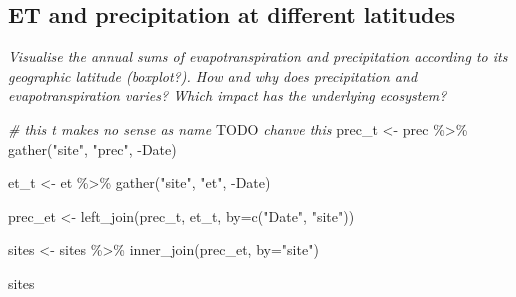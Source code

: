 \documentclass[
]{article}
\newenvironment{Shaded}{\begin{snugshade}}{\end{snugshade}}
\newcommand{\AlertTok}[1]{\textcolor[rgb]{0.94,0.16,0.16}{#1}}
\newcommand{\AttributeTok}[1]{\textcolor[rgb]{0.77,0.63,0.00}{#1}}
\newcommand{\CommentTok}[1]{\textcolor[rgb]{0.56,0.35,0.01}{\textit{#1}}}
\newcommand{\FunctionTok}[1]{\textcolor[rgb]{0.00,0.00,0.00}{#1}}
\newcommand{\NormalTok}[1]{#1}
\newcommand{\OtherTok}[1]{\textcolor[rgb]{0.56,0.35,0.01}{#1}}
\newcommand{\SpecialCharTok}[1]{\textcolor[rgb]{0.00,0.00,0.00}{#1}}
\newcommand{\StringTok}[1]{\textcolor[rgb]{0.31,0.60,0.02}{#1}}
\begin{document}
\hypertarget{et-and-precipitation-at-different-latitudes}{%
\subsection{ET and precipitation at different
latitudes}\label{et-and-precipitation-at-different-latitudes}}

\emph{Visualise the annual sums of evapotranspiration and precipitation
according to its geographic latitude (boxplot?). How and why does
precipitation and evapotranspiration varies? Which impact has the
underlying ecosystem?}

\begin{Shaded}
\begin{Highlighting}[]
\CommentTok{\# this t makes no sense as name }\AlertTok{TODO}\CommentTok{ chanve this}
\NormalTok{prec\_t }\OtherTok{\textless{}{-}}\NormalTok{ prec }\SpecialCharTok{\%\textgreater{}\%}
  \FunctionTok{gather}\NormalTok{(}\StringTok{"site"}\NormalTok{, }\StringTok{"prec"}\NormalTok{, }\SpecialCharTok{{-}}\NormalTok{Date)}

\NormalTok{et\_t }\OtherTok{\textless{}{-}}\NormalTok{ et }\SpecialCharTok{\%\textgreater{}\%}
  \FunctionTok{gather}\NormalTok{(}\StringTok{"site"}\NormalTok{, }\StringTok{"et"}\NormalTok{, }\SpecialCharTok{{-}}\NormalTok{Date) }

\NormalTok{prec\_et }\OtherTok{\textless{}{-}} \FunctionTok{left\_join}\NormalTok{(prec\_t, et\_t, }\AttributeTok{by=}\FunctionTok{c}\NormalTok{(}\StringTok{"Date"}\NormalTok{, }\StringTok{"site"}\NormalTok{))}

\NormalTok{sites }\OtherTok{\textless{}{-}}\NormalTok{ sites }\SpecialCharTok{\%\textgreater{}\%}
  \FunctionTok{inner\_join}\NormalTok{(prec\_et, }\AttributeTok{by=}\StringTok{"site"}\NormalTok{) }
\end{Highlighting}
\end{Shaded}

\begin{Shaded}
\begin{Highlighting}[]
\NormalTok{sites}
\end{Highlighting}
\end{Shaded}
\end{document}
